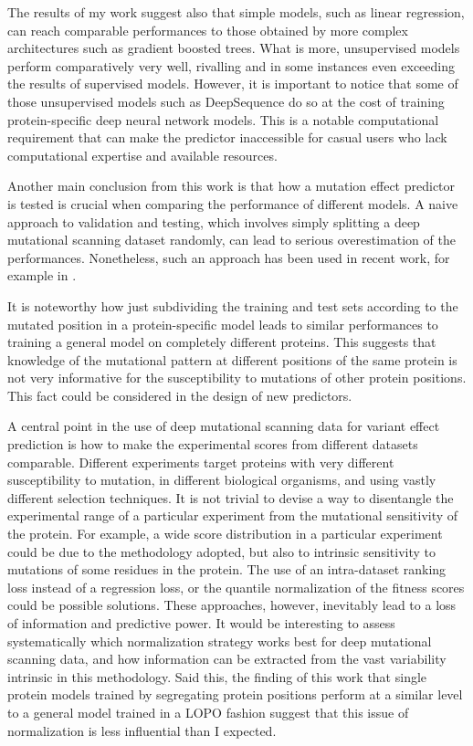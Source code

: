 The results of my work suggest also that simple models, such as linear regression, can reach comparable performances to those obtained by more complex architectures such as gradient boosted trees.
What is more, unsupervised models perform comparatively very well, rivalling and in some instances even exceeding the results of supervised models.
However, it is important to notice that some of those unsupervised models such as DeepSequence \parencite{Riesselman2018} do so at the cost of training protein-specific deep neural network models.
This is a notable computational requirement that can make the predictor inaccessible for casual users who lack computational expertise and available resources.

Another main conclusion from this work is that how a mutation effect predictor is tested is crucial when comparing the performance of different models.
A naive approach to validation and testing, which involves simply splitting a deep mutational scanning dataset randomly, can lead to serious overestimation of the performances.
Nonetheless, such an approach has been used in recent work, for example in \textcite{Gelman2020}.

It is noteworthy how just subdividing the training and test sets according to the mutated position in a protein-specific model leads to similar performances to training a general model on completely different proteins.
This suggests that knowledge of the mutational pattern at different positions of the same protein is not very informative for the susceptibility to mutations of other protein positions.
This fact could be considered in the design of new predictors.

A central point in the use of deep mutational scanning data for variant effect prediction is how to make the experimental scores from different datasets comparable.
Different experiments target proteins with very different susceptibility to mutation, in different biological organisms, and using vastly different selection techniques.
It is not trivial to devise a way to disentangle the experimental range of a particular experiment from the mutational sensitivity of the protein.
For example, a wide score distribution in a particular experiment could be due to the methodology adopted, but also to intrinsic sensitivity to mutations of some residues in the protein.
The use of an intra-dataset ranking loss instead of a regression loss, or the quantile normalization of the fitness scores could be possible solutions.
These approaches, however, inevitably lead to a loss of information and predictive power.
It would be interesting to assess systematically which normalization strategy works best for deep mutational scanning data, and how information can be extracted from the vast variability intrinsic in this methodology.
Said this, the finding of this work that single protein models trained by segregating protein positions perform at a similar level to a general model trained in a LOPO fashion suggest that this issue of normalization is less influential than I expected.

